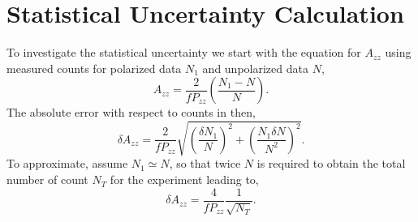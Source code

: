 \documentclass[12pt]{article}
\begin{document}
\section{Statistical Uncertainty Calculation}
\label{stat}
To investigate the statistical uncertainty we start with the equation for $A_{zz}$ using
measured counts for polarized data $N_1$ and unpolarized data $N$, 
\begin{equation}
A_{zz}=\frac{2}{fP_{zz}}\left(\frac{N_1-N}{N}\right).
\end{equation}
The absolute error with respect to counts in then,
\begin{equation}
\delta A_{zz}=\frac{2}{fP_{zz}}\sqrt{\left(\frac{\delta N_1}{N}\right)^2+\left(\frac{N_1\delta N}{N^2}\right)^2}.
\end{equation}
To approximate, assume $N_1\simeq N$, so that twice $N$ is required to obtain the total number of count
$N_T$ for the experiment leading to,
\begin{equation}
\delta A_{zz}=\frac{4}{fP_{zz}}\frac{1}{\sqrt{N_T}}.
\end{equation}


\clearpage
\end{document}
